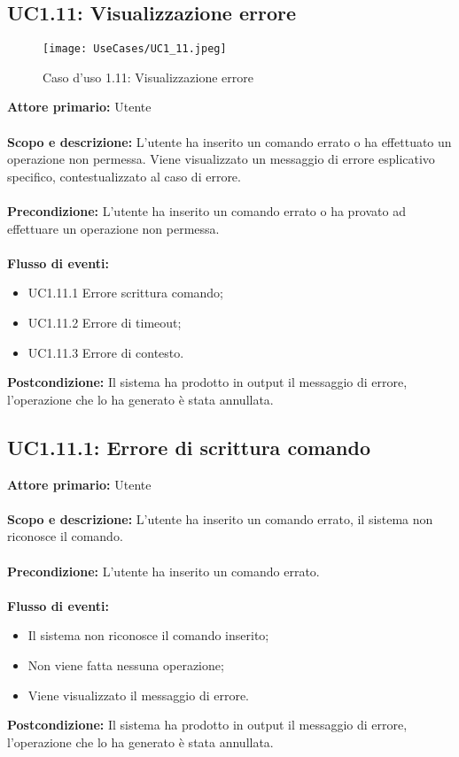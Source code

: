 \documentclass{scalatekids-article}
\begin{document}
\subsection{UC1.11: Visualizzazione errore}
\begin{figure}[H]
  \begin{center}
    \texttt{[image: UseCases/UC1\_11.jpeg]}
    \caption{Caso d'uso 1.11: Visualizzazione errore}
  \end{center}
\end{figure}
\textbf{Attore primario:} Utente \\ \\
\textbf{Scopo e descrizione:} L'utente ha inserito un comando errato o ha effettuato un operazione non permessa. Viene visualizzato un messaggio di errore esplicativo specifico, contestualizzato al caso di errore.\\ \\
\textbf{Precondizione:} L'utente ha inserito un comando errato o ha provato ad effettuare un operazione non permessa.\\ \\
\textbf{Flusso di eventi:}
\begin{itemize}
\item UC1.11.1 Errore scrittura comando;
\item UC1.11.2 Errore di timeout;
\item UC1.11.3 Errore di contesto.
\end{itemize}
\textbf{Postcondizione:} Il sistema ha prodotto in output il messaggio di errore, l'operazione che lo ha generato è stata annullata.
\subsection{UC1.11.1: Errore di scrittura comando}
\textbf{Attore primario:} Utente \\ \\
\textbf{Scopo e descrizione:} L'utente ha inserito un comando errato, il sistema non riconosce il comando.\\ \\
\textbf{Precondizione:} L'utente ha inserito un comando errato.\\ \\
\textbf{Flusso di eventi:}
\begin{itemize}
\item Il sistema non riconosce il comando inserito;
\item Non viene fatta nessuna operazione;
\item Viene visualizzato il messaggio di errore.
\end{itemize}
\textbf{Postcondizione:} Il sistema ha prodotto in output il messaggio di errore, l'operazione che lo ha generato è stata annullata.
\end{document}
